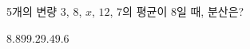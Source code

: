 5개의 변량 $3$, $8$, $x$, $12$, $7$의 평균이 8일 때, 분산은?
\begin{choices32}{$8.8$}{$9$}{$9.2$}{$9.4$}{$9.6$}\end{choices32}
